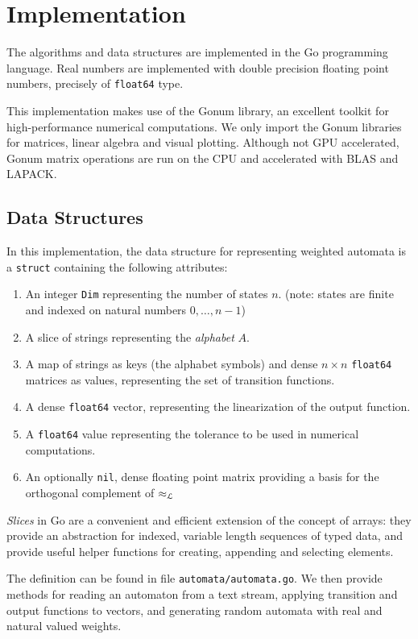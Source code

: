 \section{Implementation}
\label{sec:impl}

The algorithms and data structures are implemented in the Go programming 
language. Real numbers are implemented with double precision floating point numbers,  
precisely of \texttt{float64} type.

This implementation makes use of the Gonum library, 
an excellent toolkit for high-performance numerical computations.
We only import the Gonum libraries for matrices, linear algebra 
and visual plotting.
Although not GPU accelerated, Gonum matrix operations are run on 
the CPU and accelerated with BLAS and LAPACK.


\subsection{Data Structures}
In this implementation, the data structure for representing weighted automata is a \texttt{struct} containing
the following attributes:
\begin{enumerate}
    \item An integer \texttt{Dim} representing the number of states $n$. 
    (note: states are finite and indexed on natural numbers $0, \hdots, n-1$)
    \item A slice of strings representing the \textit{alphabet} $A$.
    \item A map of strings as keys (the alphabet symbols) and dense $n \times n$ \texttt{float64} matrices as values,
    representing the set of transition functions.
    \item A dense \texttt{float64} vector, representing the linearization of the output function. 
    \item A \texttt{float64} value representing the tolerance to be used in numerical computations.
    \item An optionally \texttt{nil}, dense floating point matrix providing a basis for the orthogonal 
    complement of $\approx_{\mathcal{L}}$
\end{enumerate}
\begin{note}
    \textit{Slices} in Go are a convenient and efficient extension of the concept of arrays: 
    they provide an abstraction for indexed, variable length sequences of typed data, and 
    provide useful helper functions for creating, appending and selecting elements. 
\end{note}
The definition can be found in file \texttt{automata/automata.go}.
We then provide methods for reading an automaton from a text stream, applying transition
and output functions to vectors, and generating random automata with real and natural valued weights.


